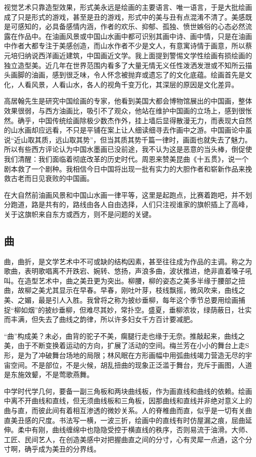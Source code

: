 \documentclass{article}
\begin{document}
视觉艺术只靠造型效果，形式美永远是绘画的主要语言、唯一语言，于是大批绘画成了只是形式的游戏，甚至是丑的游戏，形式中的美与丑有点混淆不清了。美感既是可感知的，必具备感情内涵，作者的欢乐、抑郁、孤独、愤世嫉俗的心态必然流露在作品中。在油画风景或中国山水画中都可识别其画中诗、画中情，只是在油画中作者大都专注于美感创造，而山水作者不少是文人，有意寓诗情于画意，所以蔡元培归纳说西洋画近建筑，中国画近文学。我上面提到警惕文学性绘画有损绘画的独立造型美。近几年在世界范围内看多了大量无情无义任性泼洒发泄或不知所云描头画脚的油画，感到很乏味，令人怀念被抛弃或遗忘了的文化底蕴。绘画首先是文化，人看风景，人看山水，各人的视角千变万化，其深层的原因是文化差异。

高居翰先生是研究中国绘画的专家，他看到美国大都会博物馆展出的中国画，整体效果很弱，与西方油画比，吸引不了观众，他站在维护中国画的立场上，感到很怅然。确乎，中国传统绘画除极少数杰作外，挂上墙后显得散漫无力，而表现大自然的山水画却应远看，不只是平铺在案上让人细读细寻去作画中之游。中国画论中虽说“近山取其质，远山取其势”，但当其质其势千篇一律时，画面也就失去了魅力。所以有些西方评论认为中国水墨画已没前途，我不认为这是恶意的当头棒，倒促使我们清醒：我们面临着彻底改革的历史时代。周恩来赞美昆曲《十五贯》，说一个剧本救了一个剧种。我相信今日中国将出现一批有实力的大胆作者和崭新作品来挽救古老而日见衰败的中国画。

在大自然前油画风景和中国山水画一律平等，这里是起跑点，比赛着跑吧，并不划分跑道，路是共有的，路线由各人自由选择，人们只注视谁家的旗帜插上了高峰，关于这旗帜来自东方或西方，则不是问题的关键。
\subsection{曲}
曲，曲折，是文学艺术中不可或缺的结构因素，甚至往往成为作品的主调。称之为歌曲，表明歌唱离不开跌宕、婉转、悠扬，声浪多曲，波状推进，绝非直着嗓子吼叫。在造型艺术中，曲之美丑更为突出。柳腰，柳的姿态之美多半缘于腰部之扭曲，故柳之美尤其显示在早春。早春，刚吐叶芽，枝线飘摇，微风吹来，曲线之美、之媚，最是引人入胜。我曾将之称为披纱垂柳，每年这个季节总要用绘画捕捉“柳如烟”的披纱垂柳，但难尽其妙，常扑空。盛夏，垂柳浓妆，绿荫蔽日，壮实而丰满，但失去了曲线之韵律，所以许多妇女千方百计要减肥。

“曲”构成美？未必，曲背的驼子不美，瘸腿行走也缘于无奈。推敲起来，曲线之美，由于不断变换着运动的方向，扩展了活动的空间。梅兰芳在小小的舞台上走S形，是为了冲破舞台场地的局限；林风眠在方形画幅中用弧曲线竭力营造无尽的宇宙空间。不是部位，不是火候，胡乱扭曲的现象正泛滥于舞台，充斥于画图，人道是东施效颦，不是莺歌燕舞。

中学时代学几何，要备一副三角板和两块曲线板，作为画直线和曲线的依赖。绘画中离不开曲线和直线，但无须曲线板和三角板，因那曲线和直线并非绝对意义上的曲与直，而彼此间有着相互渗透的微妙关系。人的脊椎曲而直，似乎是一切有关曲直美丑感的尺度。书法写一横，一波三折，绘画中的直线有时仿屋漏之痕，屈曲延伸。柔中有刚，曲线缠绵中也隐隐受控于横直线的秩序，否则易流于油滑。大师、工匠、民间艺人，在创造美感中对把握曲直之间的分寸，心有灵犀一点通，这个分寸啊，确乎成为美丑的分界线。
\end{document}
